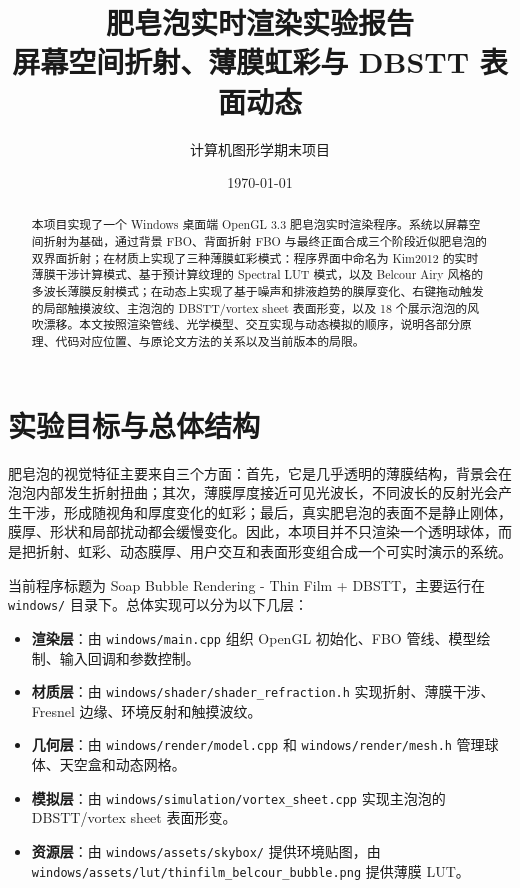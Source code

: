 \documentclass[UTF8,a4paper,11pt]{ctexart}
\title{\textbf{肥皂泡实时渲染实验报告}\\
\large 屏幕空间折射、薄膜虹彩与 DBSTT 表面动态}
\author{计算机图形学期末项目}
\date{\today}
\newcommand{\projectname}{Soap Bubble Rendering - Thin Film + DBSTT}
\newcommand{\codepath}[1]{\texttt{#1}}
\begin{document}
\maketitle

\begin{abstract}
本项目实现了一个 Windows 桌面端 OpenGL 3.3 肥皂泡实时渲染程序。系统以屏幕空间折射为基础，通过背景 FBO、背面折射 FBO 与最终正面合成三个阶段近似肥皂泡的双界面折射；在材质上实现了三种薄膜虹彩模式：程序界面中命名为 Kim2012 的实时薄膜干涉计算模式、基于预计算纹理的 Spectral LUT 模式，以及 Belcour Airy 风格的多波长薄膜反射模式；在动态上实现了基于噪声和排液趋势的膜厚变化、右键拖动触发的局部触摸波纹、主泡泡的 DBSTT/vortex sheet 表面形变，以及 18 个展示泡泡的风吹漂移。本文按照渲染管线、光学模型、交互实现与动态模拟的顺序，说明各部分原理、代码对应位置、与原论文方法的关系以及当前版本的局限。
\end{abstract}

\tableofcontents
\newpage

\section{实验目标与总体结构}

肥皂泡的视觉特征主要来自三个方面：首先，它是几乎透明的薄膜结构，背景会在泡泡内部发生折射扭曲；其次，薄膜厚度接近可见光波长，不同波长的反射光会产生干涉，形成随视角和厚度变化的虹彩；最后，真实肥皂泡的表面不是静止刚体，膜厚、形状和局部扰动都会缓慢变化。因此，本项目并不只渲染一个透明球体，而是把折射、虹彩、动态膜厚、用户交互和表面形变组合成一个可实时演示的系统。

当前程序标题为 \projectname，主要运行在 \codepath{windows/} 目录下。总体实现可以分为以下几层：

\begin{itemize}
  \item \textbf{渲染层}：由 \codepath{windows/main.cpp} 组织 OpenGL 初始化、FBO 管线、模型绘制、输入回调和参数控制。
  \item \textbf{材质层}：由 \codepath{windows/shader/shader\_refraction.h} 实现折射、薄膜干涉、Fresnel 边缘、环境反射和触摸波纹。
  \item \textbf{几何层}：由 \codepath{windows/render/model.cpp} 和 \codepath{windows/render/mesh.h} 管理球体、天空盒和动态网格。
  \item \textbf{模拟层}：由 \codepath{windows/simulation/vortex\_sheet.cpp} 实现主泡泡的 DBSTT/vortex sheet 表面形变。
  \item \textbf{资源层}：由 \codepath{windows/assets/skybox/} 提供环境贴图，由 \codepath{windows/assets/lut/thinfilm\_belcour\_bubble.png} 提供薄膜 LUT。
\end{itemize}
\end{document}
